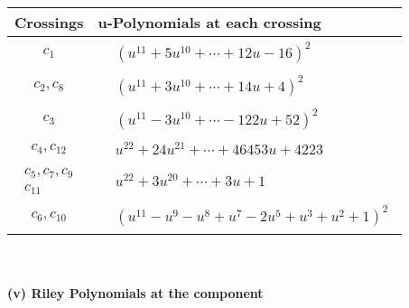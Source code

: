 \documentclass[1p]{elsarticle_modified}
\theoremstyle{definition}
\begin{document}
\begin{tabular}{m{50pt}|m{274pt}}
Crossings & \hspace{64pt}u-Polynomials at each crossing \\
\hline $$\begin{aligned}c_{1}\end{aligned}$$&$\begin{aligned}
&(u^{11}+5 u^{10}+\cdots+12 u-16)^{2}
\end{aligned}$\\
\hline $$\begin{aligned}c_{2},c_{8}\end{aligned}$$&$\begin{aligned}
&(u^{11}+3 u^{10}+\cdots+14 u+4)^{2}
\end{aligned}$\\
\hline $$\begin{aligned}c_{3}\end{aligned}$$&$\begin{aligned}
&(u^{11}-3 u^{10}+\cdots-122 u+52)^{2}
\end{aligned}$\\
\hline $$\begin{aligned}c_{4},c_{12}\end{aligned}$$&$\begin{aligned}
&u^{22}+24 u^{21}+\cdots+46453 u+4223
\end{aligned}$\\
\hline $$\begin{aligned}c_{5},c_{7},c_{9}\\c_{11}\end{aligned}$$&$\begin{aligned}
&u^{22}+3 u^{20}+\cdots+3 u+1
\end{aligned}$\\
\hline $$\begin{aligned}c_{6},c_{10}\end{aligned}$$&$\begin{aligned}
&(u^{11}- u^9- u^8+u^7-2 u^5+u^3+u^2+1)^2
\end{aligned}$\\
\hline
\end{tabular}\\~\\
\newpage\renewcommand{\arraystretch}{1}
\flushleft \textbf{(v) Riley Polynomials at the component}\newline \\
\end{document}
